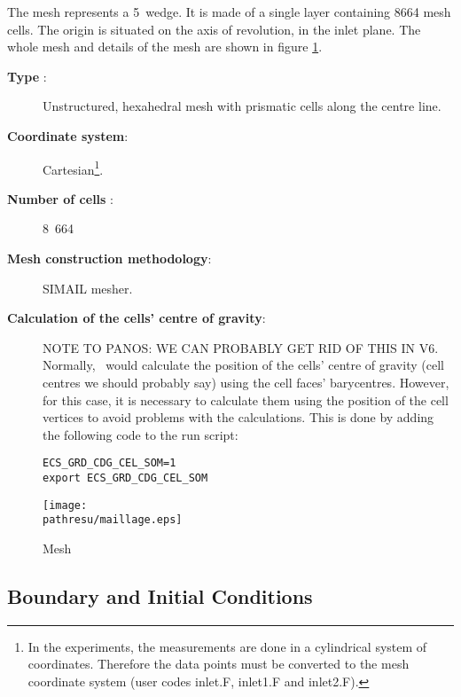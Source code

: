 \documentclass[a4paper,twoside,12pt]{article}
\newcommand{\pathresu}{./FIGURES}
\begin{document}
The mesh represents a 5\degree\ wedge. It is made of a single layer containing 8664 mesh cells. The origin is situated on the axis of revolution, in the inlet plane. The whole mesh and details of the mesh are shown in figure \ref{maillage}.

\begin{description}

   \item[\textbf{Type} :] Unstructured, hexahedral mesh with prismatic cells along the centre line.

   \item[\textbf{Coordinate system}:] Cartesian\footnote{In the experiments, the measurements are done in a cylindrical system of coordinates. Therefore the data points must be converted to the mesh coordinate system (user codes inlet.F,
            inlet1.F and inlet2.F).}.

   \item[\textbf{Number of cells} :] 8~664

   \item[\textbf{Mesh construction methodology}:] SIMAIL mesher.

   \item[\textbf{Calculation of the cells' centre of gravity}:]
         NOTE TO PANOS: WE CAN PROBABLY GET RID OF THIS IN V6.
         Normally, \CS\ would calculate the position of the cells' centre of gravity (cell centres we should probably say) using the cell faces' barycentres. However, for this case, it is necessary to calculate them using the position of the cell vertices to avoid problems with the calculations. This is done by adding the following code to the run script:

         \begin{verbatim}
ECS_GRD_CDG_CEL_SOM=1
export ECS_GRD_CDG_CEL_SOM
\end{verbatim}

\end{description}

\begin{figure}[h]
   \centerline{\texttt{[image: \\pathresu/maillage.eps]}}
   \caption{\label{maillage}{Mesh}}
\end{figure}

\subsection{Boundary and Initial Conditions}
\end{document}
